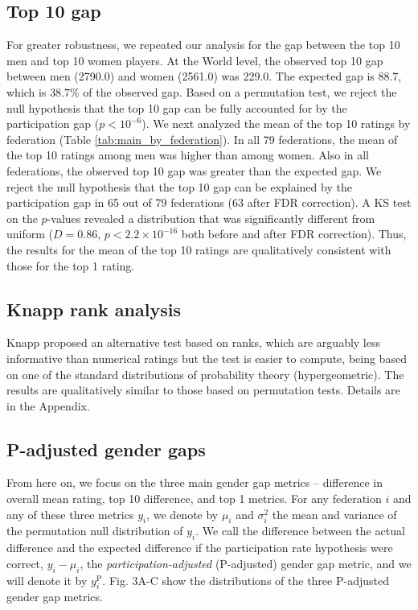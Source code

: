 \documentclass[9pt,twocolumn,twoside,lineno]{pnas-new}
\begin{document}
\subsection*{Top 10 gap} 
For greater robustness, we repeated our analysis for the gap between the top 10 men and top 10 women players. At the World level, the observed top 10 gap between men (2790.0) and women (2561.0) was 229.0. The expected gap is 88.7, which is $38.7\%$ of the observed gap. Based on a permutation test, we reject the null hypothesis that the top 10 gap can be fully accounted for by the participation gap ($p < 10^{-6}$). We next analyzed the mean of the top 10 ratings by federation (Table \ref{tab:main_by_federation}). In all 79 federations, the mean of the top 10 ratings among men was higher than among women. Also in all federations, the observed top 10 gap was greater than the expected gap. We reject the null hypothesis that the top 10 gap can be explained by the participation gap in 65 out of 79 federations (63 after FDR correction). A KS test on the $p$-values revealed a distribution that was significantly different from uniform ($D=0.86$, $p < 2.2\times 10^{-16}$ both before and after FDR correction). Thus, the results for the mean of the top 10 ratings are qualitatively consistent with those for the top 1 rating.




\subsection*{Knapp rank analysis} 
Knapp \cite{knapp2010prsb} proposed an alternative test based on ranks, which are arguably less informative than numerical ratings but the test is easier to compute, being based on one of the standard distributions of probability theory (hypergeometric). The results are qualitatively similar to those based on permutation tests. Details are in the Appendix.




\subsection*{P-adjusted gender gaps} 
From here on, we focus on the three main gender gap metrics -- difference in overall mean rating, top 10 difference, and top 1 metrics. 
For  any federation $i$ and any of these three metrics $y_i$, we denote by $\mu_i$ and $\sigma_i^2$ the mean and variance of the permutation null distribution of $y_i$. We call the difference between the actual difference and the expected difference if the participation rate hypothesis were correct, $y_i-\mu_i$, the {\it participation-adjusted} (P-adjusted) gender gap metric, and we will denote it by $y^\text{P}_i$. Fig. 3A-C show the distributions of the three P-adjusted gender gap metrics.
\end{document}
